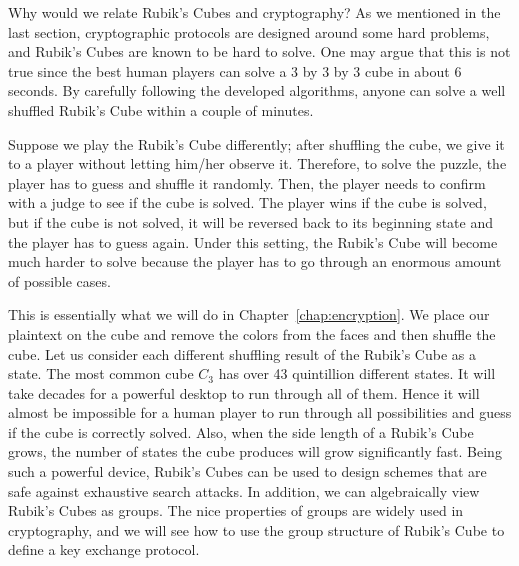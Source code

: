 \par Why would we relate Rubik's Cubes and cryptography? As we mentioned in the last section, cryptographic protocols are designed around some hard problems, and Rubik's Cubes are known to be hard to solve. One may argue that this is not true since the best human players can solve a 3 by 3 by 3 cube in about 6 seconds. By carefully following the developed algorithms, anyone can solve a well shuffled Rubik's Cube within a couple of minutes. \par Suppose we play the Rubik's Cube differently; after shuffling the cube, we give it to a player without letting him/her observe it. Therefore, to solve the puzzle, the player has to guess and shuffle it randomly. Then, the player needs to confirm with a judge to see if the cube is solved. The player wins if the cube is solved, but if the cube is not solved, it will be reversed back to its beginning state and the player has to guess again. Under this setting, the Rubik's Cube will become much harder to solve because the player has to go through an enormous amount of possible cases. 
\par This is essentially what we will do in Chapter~\ref{chap:encryption}. We place our plaintext on the cube and remove the colors from the faces and then shuffle the cube. Let us consider each different shuffling result of the Rubik's Cube as a state. The most common cube $C_3$ has over 43 quintillion different states. It will take decades for a powerful desktop to run through all of them. Hence it will almost be impossible for a human player to run through all possibilities and guess if the cube is correctly solved. Also, when the side length of a Rubik's Cube grows, the number of states the cube produces will grow significantly fast. Being such a powerful device, Rubik's Cubes can be used to design schemes that are safe against exhaustive search attacks. In addition, we can algebraically view Rubik's Cubes as groups. The nice properties of groups are widely used in cryptography, and we will see how to use the group structure of Rubik's Cube to define a key exchange protocol.

